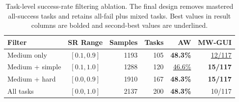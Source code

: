 \begin{table}[h]
\centering
\paperTable
\caption{Task-level success-rate filtering ablation. The final \ourmethod design removes mastered all-success tasks and retains all-fail plus mixed tasks. Best values in result columns are bolded and second-best values are underlined.}
\label{tab:task_filter_ablation_main}
\begin{tabular}{@{}l c r r r r@{}}
\toprule
\textbf{Filter} & \textbf{SR Range} & \textbf{Samples} & \textbf{Tasks} & \textbf{AW} & \textbf{MW-GUI} \\
\midrule
Medium only & $[0.1,0.9]$ & 1193 & 105 & \textbf{48.3\%} & \underline{12/117} \\
Medium + simple & $[0.1,1.0]$ & 1288 & 120 & \underline{46.6\%} & \textbf{15/117} \\
\rowcolor{oursrowcolor}
Medium + hard & $[0.0,0.9]$ & 1910 & 167 & \textbf{48.3\%} & \textbf{15/117} \\
All tasks & $[0.0,1.0]$ & 2137 & 200 & \textbf{48.3\%} & 10/117 \\
\bottomrule
\end{tabular}
\end{table}
